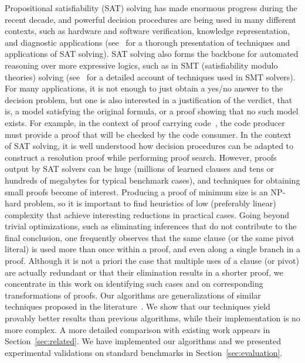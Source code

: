 \documentclass[envcountsame]{llncs}
\begin{document}
Propositional satisfiability (SAT) solving has made enormous progress
during the recent decade, and powerful decision procedures are being
used in many different contexts, such as hardware and software
verification, knowledge representation, and diagnostic applications
(see~\cite{HandbookOfSAT2009} for a thorough presentation of
techniques and applications of SAT solving). SAT solving also forms
the backbone for automated reasoning over more expressive logics, such
as in SMT (satisfiability modulo theories) solving
(see~\cite{Barrett14} for a detailed account of techniques used in
SMT solvers). For many applications, it is not enough to just obtain a
yes/no answer to the decision problem, but one is also interested in a
justification of the verdict, that is, a model satisfying the original
formula, or a proof showing that no such model exists. For example, in
the context of proof carrying
code~\cite{Necula1997Proof-carrying-code}, the code producer must
provide a proof that will be checked by the code consumer.
In the context of SAT solving, it is well understood how decision
procedures can be adapted to construct a resolution proof while performing proof
search. However, proofs output by SAT solvers can be huge 
(millions of learned clauses and tens or hundreds of
megabytes for typical benchmark cases), and techniques for obtaining small
proofs become of interest. Producing a proof of minimum size is an NP-hard
problem, so it is important to find
heuristics of low (preferably linear) complexity that achieve interesting
reductions in practical cases. Going beyond trivial optimizations, such as
eliminating inferences that do not contribute to the final conclusion, one
frequently observes that the same clause (or the same pivot literal) is used more than once within a proof,
and even along a single branch in a proof. Although it is not a priori the case
that multiple uses of a clause (or pivot) are actually redundant or that their elimination
results in a shorter proof, we concentrate in this work on identifying such
cases and on corresponding transformations of proofs. Our algorithms are
generalizations of similar techniques proposed in the
literature~\cite{Bar-IlanFuhrmannHooryShachamStrichman2009Linear-time-reductions-of-resolution-proofs,Cotton2010Two-Techniques-for-Minimizing-Resolution-Proofs,SimoneBrutomessoSarygina2010An-Efficient-and-Flexible-Approach-to-Resolution-Proof-Reduction}.
We show that our techniques yield provably better results than previous
algorithms, while their implementation is no more complex. A more detailed
comparison with existing work appears in Section~\ref{sec:related}. We have
implemented our algorithms and we presented experimental validations
on standard benchmarks in Section~\ref{sec:evaluation}. 
\end{document}

